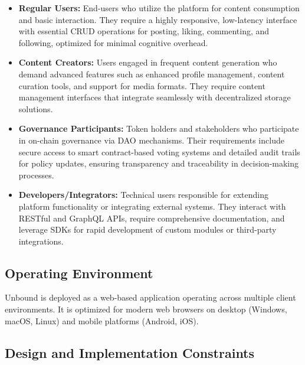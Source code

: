 \documentclass[a4paper,12pt]{article}
\begin{document}
\begin{itemize}
    \item \textbf{Regular Users:} End-users who utilize the platform for content consumption and basic interaction. They require a highly responsive, low-latency interface with essential CRUD operations for posting, liking, commenting, and following, optimized for minimal cognitive overhead.
    \item \textbf{Content Creators:} Users engaged in frequent content generation who demand advanced features such as enhanced profile management, content curation tools, and support for media formats. They require content management interfaces that integrate seamlessly with decentralized storage solutions.
    \item \textbf{Governance Participants:} Token holders and stakeholders who participate in on-chain governance via DAO mechanisms. Their requirements include secure access to smart contract-based voting systems and detailed audit trails for policy updates, ensuring transparency and traceability in decision-making processes.
    \item \textbf{Developers/Integrators:} Technical users responsible for extending platform functionality or integrating external systems. They interact with RESTful and GraphQL APIs, require comprehensive documentation, and leverage SDKs for rapid development of custom modules or third-party integrations.
\end{itemize}

\subsection{Operating Environment}

Unbound is deployed as a web-based application operating across multiple client environments. It is optimized for modern web browsers on desktop (Windows, macOS, Linux) and mobile platforms (Android, iOS).


\subsection{Design and Implementation Constraints}
\end{document}

